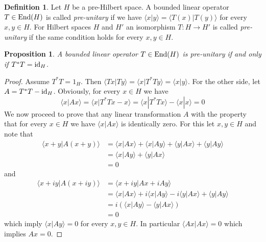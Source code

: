 \documentclass[12pt]{article}
\newtheorem{prop}[thm]{Proposition}
\theoremstyle{definition}
\newtheorem{dfn}[thm]{Definition}
\theoremstyle{remark}
\newcommand{\End}[1]{\textup{End}(#1)}
\begin{document}
    \begin{dfn}
        Let $H$ be a pre-Hilbert space. A bounded linear operator $T\in\End{H}$ is called \emph{pre-unitary} if we have
        $\langle x|y \rangle = \langle T(x)|T(y) \rangle$
        for every $x,y\in H$. For Hilbert spaces $H$ and $H'$ an isomorphism $T\colon H\to H'$ is called \emph{pre-unitary} if the same condition holds for every $x,y\in H$.
    \end{dfn}

    \begin{prop}
        A bounded linear operator $T\in\End{H}$ is pre-unitary if and only if $T^*T=\textup{id}_H$.
    \end{prop}

    \begin{proof}
        Assume $T^*T=1_H$. Then $\langle Tx|Ty \rangle = \langle x |T^*Ty \rangle = \langle x|y \rangle$. For the other side, let $A=T^*T-\textup{id}_H$. Obviously, for every $x\in H$ we have
        $$
        \langle x | Ax \rangle = \langle x | T^*Tx - x \rangle = \langle x | T^*Tx \rangle - \langle x | x \rangle = 0
        $$
        We now proceed to prove that any linear transformation $A$ with the property that for every $x\in H$ we have $\langle x | Ax \rangle$ is identically zero. For this let $x,y\in H$ and note that
        \begin{align*}
            \langle x+y | A(x+y) \rangle &= \langle x | Ax \rangle + \langle x | Ay \rangle + \langle y | Ax \rangle + \langle y | Ay \rangle \\
            &= \langle x | Ay \rangle + \langle y | Ax \rangle \\
            &= 0
        \end{align*}
        and
        \begin{align*}
            \langle x + iy | A(x + iy) \rangle &= \langle x + iy | Ax + iAy \rangle \\
            &= \langle x | Ax \rangle + i \langle x | Ay \rangle - i \langle y | Ax \rangle + \langle y | Ay \rangle \\
            &= i (\langle x | Ay \rangle - \langle y | Ax \rangle) \\
            &= 0
        \end{align*}
        which imply $\langle x|Ay \rangle = 0$ for every $x,y\in H$. In particular $\langle Ax|Ax \rangle = 0$ which implies $Ax = 0$.
        
    \end{proof}

    \printbibliography
\end{document}
